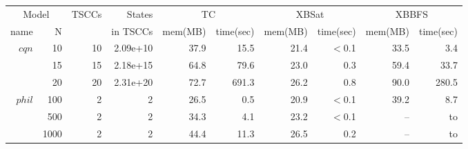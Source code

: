 

\renewcommand{\baselinestretch}{0.95}
\small
\setlength{\tabcolsep}{0.60ex}
\begin{tabular}{|r|r|r|r|r| r|r|r|r|r|}
\hline
\multicolumn{2}{|c|}{Model} & \multirow{2}{*}{TSCCs} & States& \multicolumn{2}{|c|}{TC} & \multicolumn{2}{|c|}{XBSat} & \multicolumn{2}{|c|}{XBBFS} \\
                       \cline{1-2}\cline{5-10}
                                                                    name & N &  & in TSCCs  & mem(MB) & time(sec) & mem(MB) & time(sec) & mem(MB) & time(sec)\\
\hline \hline
\multirow{3}{*}{$cqn$}        &10 &10 &2.09e+10       &37.9   &15.5           &21.4       &$<$0.1 &33.5       &3.4      \\
                                                &15 &15 &2.18e+15       &64.8   &79.6           &23.0       &0.3        &59.4   &33.7 \\
                                                &20 &20 &2.31e+20       &72.7   &691.3      &26.2       &0.8        &90.0   &280.5 \\
\hline
\multirow{3}{*}{$phil$}  &100        &2  &2      &26.5   &0.5            &20.9   &$<$0.1     &39.2   &8.7 \\
                                            &500        &2  &2      &34.3   &4.1            &23.2   &$<$0.1     &--     &to \\
                                            &1000   &2  &2      &44.4   &11.3           &26.5   &0.2            &--     &to \\

\end{tabular}
